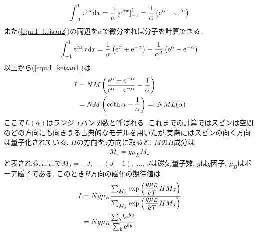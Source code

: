 \begin{align}
  \label{equ:I_keisan2}
  \int_{-1}^1{\rm e}^{\alpha x}{\rm d}x=\frac{1}{\alpha}\left[{\rm e}^{\alpha x}\right]_{-1}^1=\frac{1}{\alpha}\left({\rm e}^\alpha-{\rm e}^{-\alpha}\right)
\end{align}
また(\ref{equ:I_keisan2})の両辺を$\alpha$で微分すれば分子を計算できる.
\begin{align}
  \int_{-1}^1{\rm e}^{\alpha x}x{\rm d}x=\frac{1}{\alpha}\left({\rm e}^\alpha+{\rm e}^{-\alpha}\right)-\frac{1}{\alpha^2}\left({\rm e}^\alpha-{\rm e}^{-\alpha}\right)
\end{align}
以上から(\ref{equ:I_keisan1})は
\begin{align}
  I&=NM\left(\frac{{\rm e}^\alpha+{\rm e}^{-\alpha}}{{\rm e}^\alpha-{\rm e}^{-\alpha}}-\frac{1}{\alpha}\right)\nonumber\\
  &=NM\left(\coth\alpha-\frac{1}{\alpha}\right)=:NML(\alpha)
\end{align}
ここで$L(\alpha)$はランジュバン関数と呼ばれる.
これまでの計算ではスピンは空間のどの方向にも向きうる古典的なモデルを用いたが,実際にはスピンの向く方向は量子化されている.
$H$の方向を$z$方向に取ると, $M$の$H$成分は
\begin{align}
  M_z=g\mu_BM_J
\end{align}
と表される.ここで$M_J=-J,\ -(J-1),\ ...,\ J$は磁気量子数, $g$は$g$因子, $\mu_B$はボーア磁子である.
このとき$H$方向の磁化の期待値は
\begin{align}
  I&=Ng\mu_B\frac{\sum_{M_J}\exp\left(\displaystyle\frac{g\mu_B}{kT}HM_J\right)}{\sum_{M_J}\exp\left(\displaystyle\frac{g\mu_B}{kT}HM_J\right)}\nonumber\\
  &=Ng\mu_B\frac{\sum_{b}b{\rm e}^{by}}{\sum_{b}{\rm e}^{by}}
\end{align}
